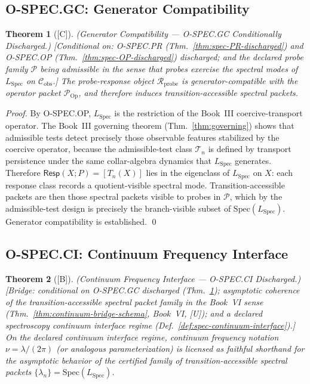 \documentclass[12pt,oneside]{amsbook}
\theoremstyle{plain}
\newtheorem{theorem}{Theorem}[section]
\theoremstyle{definition}
\theoremstyle{remark}
\newcommand{\status}[1]{\textup{[#1]}}
\begin{document}
\subsection{O-SPEC.GC: Generator Compatibility}\label{sec:spec-GC}

\begin{theorem}[\status{C}]\label{thm:spec-GC-discharged}
\textup{(Generator Compatibility --- O-SPEC.GC Conditionally Discharged.)}
\textup{[Conditional on: O-SPEC.PR (Thm.~\ref{thm:spec-PR-discharged})
and O-SPEC.OP (Thm.~\ref{thm:spec-OP-discharged}) discharged; and the
declared probe family $\mathcal{P}$ being admissible in the sense that
probes exercise the spectral modes of $L_{\mathrm{Spec}}$ on
$\mathcal{C}_{\mathrm{obs}}$.]}
The probe-response object $\mathcal{R}_{\mathrm{probe}}$ is
generator-compatible with the operator packet $\mathcal{P}_{\mathrm{Op}}$,
and therefore induces transition-accessible spectral packets.
\end{theorem}

\begin{proof}
By O-SPEC.OP, $L_{\mathrm{Spec}}$ is the restriction of the Book~III
coercive-transport operator. The Book~III governing theorem
(Thm.~\ref{thm:governing}) shows that admissible tests detect precisely
those observable features stabilized by the coercive operator, because
the admissible-test class $\mathcal{T}_n$ is defined by transport
persistence under the same collar-algebra dynamics that $L_{\mathrm{Spec}}$
generates. Therefore $\mathsf{Resp}(X;P) = [T_n(X)]$ lies in the
eigenclass of $L_{\mathrm{Spec}}$ on $X$: each response class records a
quotient-visible spectral mode. Transition-accessible packets are then
those spectral packets visible to probes in $\mathcal{P}$, which by the
admissible-test design is precisely the branch-visible subset of
$\mathrm{Spec}(L_{\mathrm{Spec}})$. Generator compatibility is
established. \qed
\end{proof}

\subsection{O-SPEC.CI: Continuum Frequency Interface}\label{sec:spec-CI}

\begin{theorem}[\status{B}]\label{thm:spec-CI-discharged}
\textup{(Continuum Frequency Interface --- O-SPEC.CI Discharged.)}
\textup{[Bridge: conditional on O-SPEC.GC discharged
(Thm.~\ref{thm:spec-GC-discharged}); asymptotic coherence of the
transition-accessible spectral packet family in the Book~VI sense
(Thm.~\ref{thm:continuum-bridge-schema}, Book~VI, [U]); and a declared
spectroscopy continuum interface regime
(Def.~\ref{def:spec-continuum-interface}).]}
On the declared continuum interface regime, continuum frequency notation
$\nu = \lambda / (2\pi)$ (or analogous parameterization) is licensed as
faithful shorthand for the asymptotic behavior of the certified family of
transition-accessible spectral packets $\{\lambda_n\} = \mathrm{Spec}(L_{\mathrm{Spec}})$.
\end{theorem}
\end{document}
